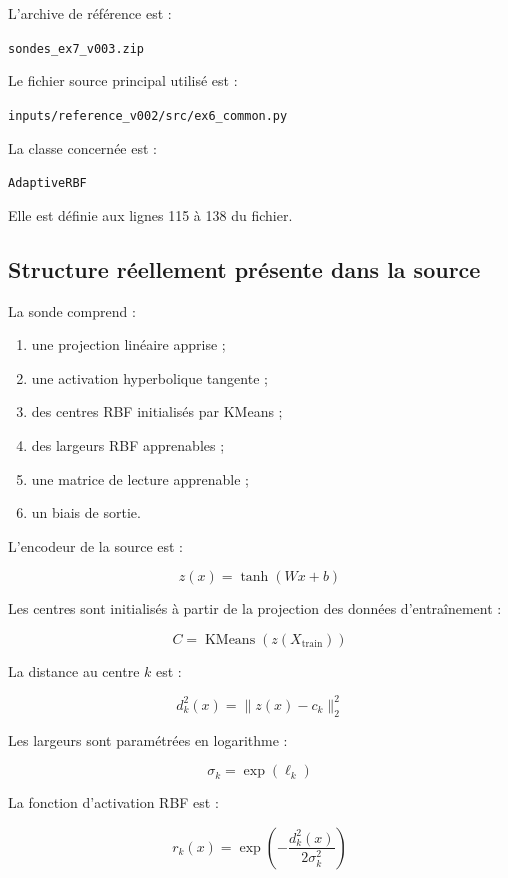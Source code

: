 \documentclass[11pt,a4paper]{article}
\begin{document}
L'archive de référence est :

\begin{center}
\texttt{sondes\_ex7\_v003.zip}
\end{center}

Le fichier source principal utilisé est :

\begin{center}
\texttt{inputs/reference\_v002/src/ex6\_common.py}
\end{center}

La classe concernée est :

\begin{center}
\texttt{AdaptiveRBF}
\end{center}

Elle est définie aux lignes 115 à 138 du fichier.

\subsection{Structure réellement présente dans la source}

La sonde comprend :

\begin{enumerate}
    \item une projection linéaire apprise ;
    \item une activation hyperbolique tangente ;
    \item des centres RBF initialisés par KMeans ;
    \item des largeurs RBF apprenables ;
    \item une matrice de lecture apprenable ;
    \item un biais de sortie.
\end{enumerate}

L'encodeur de la source est :

\[
z(x)=\tanh(Wx+b)
\]

Les centres sont initialisés à partir de la projection
des données d'entraînement :

\[
C=\operatorname{KMeans}(z(X_{\mathrm{train}}))
\]

La distance au centre $k$ est :

\[
d_k^2(x)=\|z(x)-c_k\|_2^2
\]

Les largeurs sont paramétrées en logarithme :

\[
\sigma_k=\exp(\ell_k)
\]

La fonction d'activation RBF est :

\[
r_k(x)=
\exp\left(
-\frac{d_k^2(x)}{2\sigma_k^2}
\right)
\]
\end{document}
